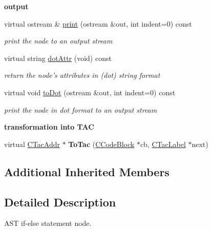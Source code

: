 \begin{Indent}{\bf output}\par
\begin{DoxyCompactItemize}
\item 
virtual ostream \& \hyperlink{classCAstStatIf_adb755f83f748022602e54d8148fc47dc}{print} (ostream \&out, int indent=0) const 
\begin{DoxyCompactList}\small\item\em print the node to an output stream \end{DoxyCompactList}\item 
virtual string \hyperlink{classCAstStatIf_aafdfbd1c0e3e469f5bb04aff3a8d918a}{dot\-Attr} (void) const 
\begin{DoxyCompactList}\small\item\em return the node's attributes in (dot) string format \end{DoxyCompactList}\item 
virtual void \hyperlink{classCAstStatIf_a5fedd72465fc5bf1927b4184db52d0e7}{to\-Dot} (ostream \&out, int indent=0) const 
\begin{DoxyCompactList}\small\item\em print the node in dot format to an output stream \end{DoxyCompactList}\end{DoxyCompactItemize}
\end{Indent}
\begin{Indent}{\bf transformation into T\-A\-C}\par
\begin{DoxyCompactItemize}
\item 
\hypertarget{classCAstStatIf_ad43ae6cb4534fecb6e0b3cf28ee8dd96}{virtual \hyperlink{classCTacAddr}{C\-Tac\-Addr} $\ast$ {\bfseries To\-Tac} (\hyperlink{classCCodeBlock}{C\-Code\-Block} $\ast$cb, \hyperlink{classCTacLabel}{C\-Tac\-Label} $\ast$next)}\label{classCAstStatIf_ad43ae6cb4534fecb6e0b3cf28ee8dd96}

\end{DoxyCompactItemize}
\end{Indent}
\subsection*{Additional Inherited Members}


\subsection{Detailed Description}
A\-S\-T if-\/else statement node. 

